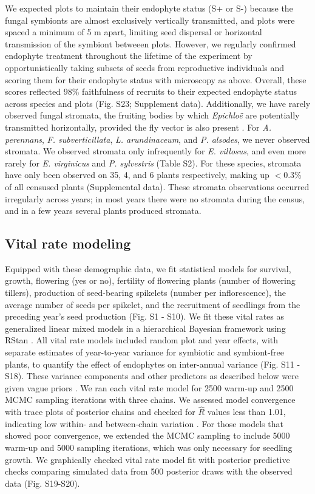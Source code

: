 \documentclass[9pt,twocolumn,twoside]{pnas-new}
\begin{document}
{We expected plots to maintain their endophyte status (S+ or S-) because the fungal symbionts are almost exclusively vertically transmitted, and plots were spaced a minimum of 5 m apart, limiting seed dispersal or horizontal transmission of the symbiont betweeen plots. 
However, we regularly confirmed endophyte treatment throughout the lifetime of the experiment by opportunistically taking subsets of seeds from reproductive individuals and scoring them for their endophyte status with microscopy as above.
Overall, these scores reflected 98\% faithfulness of recruits to their expected endophyte status across species and plots (Fig. S23; Supplement data). 
Additionally, we have rarely observed fungal stromata, the fruiting bodies by which \emph{Epichlo\"e} are potentially transmitted horizontally, provided the fly vector is also present \cite{bultman1995mutualistic}. 
For \emph{A. perennans}, \emph{F. subverticillata}, \emph{L. arundinaceum}, and \emph{P. alsodes}, we never observed stromata. 
We observed stromata only infrequently for \emph{E. villosus}, and even more rarely for \emph{E. virginicus} and \emph{P. sylvestris} (Table S2). 
For these species, stromata have only been observed on 35, 4, and 6 plants respectively, making up $< 0.3$\% of all censused plants (Supplemental data).
These stromata observations occurred irregularly across years; in most years there were no stromata during the census, and in a few years several plants produced stromata. 

\subsection*{Vital rate modeling}
Equipped with these demographic data, we fit statistical models for survival, growth, flowering (yes or no), fertility of flowering plants (number of flowering tillers), production of seed-bearing spikelets (number per inflorescence), the average number of seeds per spikelet, and the recruitment of seedlings from the preceding year's seed production (Fig. S1 - S10).  
We fit these vital rates as generalized linear mixed models in a hierarchical Bayesian framework using RStan \cite{rstan2022}. 
All vital rate models included random plot and year effects, with separate estimates of year-to-year variance for symbiotic and symbiont-free plants, to quantify the effect of endophytes on inter-annual variance (Fig. S11 - S18).
These variance components and other predictors as described below were given vague priors \cite{gabry2019visualization}.
We ran each vital rate model for 2500 warm-up and 2500 MCMC sampling iterations with three chains. 
We assessed model convergence with trace plots of posterior chains and checked for $\hat{R}$ values less than 1.01, indicating low within- and between-chain variation \cite{brooks1998general,gelman2006data}. 
For those models that showed poor convergence, we extended the MCMC sampling to include 5000 warm-up and 5000 sampling iterations, which was only necessary for seedling growth. 
We graphically checked vital rate model fit with posterior predictive checks comparing simulated data from 500 posterior draws with the observed data (Fig. S19-S20).

}
\end{document}
